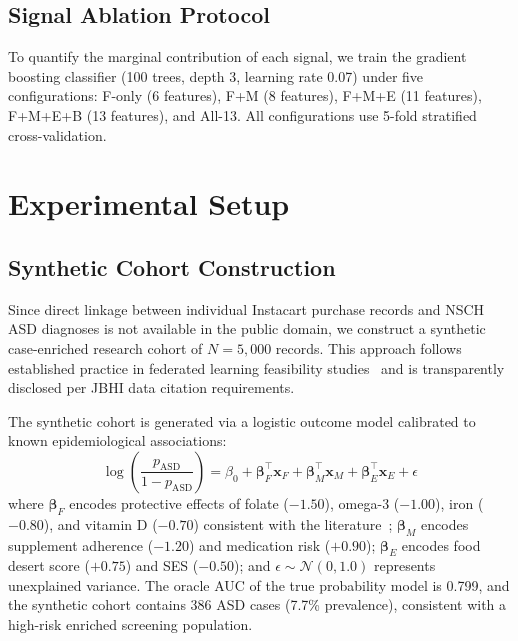 \documentclass[journal]{IEEEtran}
\begin{document}
\subsection{Signal Ablation Protocol}

To quantify the marginal contribution of each signal, we train
the gradient boosting classifier (100 trees, depth 3, learning
rate 0.07) under five configurations: F-only (6 features),
F+M (8 features), F+M+E (11 features), F+M+E+B (13 features),
and All-13. All configurations use 5-fold stratified cross-validation.

\section{Experimental Setup}
\label{sec:experiments}

\subsection{Synthetic Cohort Construction}

Since direct linkage between individual Instacart purchase records
and NSCH ASD diagnoses is not available in the public domain, we
construct a synthetic case-enriched research cohort of $N=5{,}000$
records. This approach follows established practice in federated
learning feasibility studies~\cite{mohammadifar2023federated,
alshammari2024explainable} and is transparently disclosed per
JBHI data citation requirements.

The synthetic cohort is generated via a logistic outcome model
calibrated to known epidemiological associations:
\begin{equation}
\log\!\left(\frac{p_{\text{ASD}}}{1-p_{\text{ASD}}}\right) = \beta_0 + \boldsymbol{\beta}_F^\top \mathbf{x}_F + \boldsymbol{\beta}_M^\top \mathbf{x}_M + \boldsymbol{\beta}_E^\top \mathbf{x}_E + \epsilon
\label{eq:outcome}
\end{equation}
where $\boldsymbol{\beta}_F$ encodes protective effects of folate
($-1.50$), omega-3 ($-1.00$), iron ($-0.80$), and vitamin D ($-0.70$)
consistent with the literature~\cite{liu2021folicacid, lyall2021maternal};
$\boldsymbol{\beta}_M$ encodes supplement adherence ($-1.20$) and
medication risk ($+0.90$); $\boldsymbol{\beta}_E$ encodes food desert
score ($+0.75$) and SES ($-0.50$); and $\epsilon \sim \mathcal{N}(0,1.0)$
represents unexplained variance. The oracle AUC of the true probability
model is 0.799, and the synthetic cohort contains 386 ASD cases
(7.7\% prevalence), consistent with a high-risk enriched screening
population.
\end{document}
